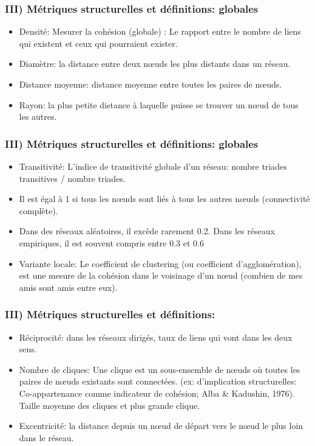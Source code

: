 \documentclass{beamer}
\begin{document}
\begin{frame}
    \frametitle{III) Métriques structurelles et définitions: globales}
    \begin{itemize}
        \item Densité: Mesurer la cohésion (globale) : Le rapport entre le nombre de liens qui existent et ceux qui pourraient exister.
        \item Diamètre: la distance entre deux nœuds les plus distants dans un réseau.
        \item Distance moyenne: distance moyenne entre toutes les paires de nœuds.
        \item Rayon:  la plus petite distance à laquelle puisse se trouver un nœud de tous les autres.
    \end{itemize}
\end{frame}

\begin{frame}
    \frametitle{III) Métriques structurelles et définitions: globales}
    \begin{itemize}
        \item Transitivité: L’indice de transitivité globale d’un réseau: nombre triades transitives / nombre triades.
        \item Il est égal à 1 si tous les nœuds sont liés à tous les autres nœuds (connectivité complète).
        \item Dans des réseaux aléatoires, il excède rarement 0.2. Dans les réseaux empiriques, il est souvent compris entre 0.3 et 0.6
        \item Variante locale: Le coefficient de clustering (ou coefficient d’agglomération), est une mesure de la cohésion dans le voisinage d’un nœud (combien de mes amis sont amis entre eux).
    \end{itemize}
\end{frame}

\begin{frame}
    \frametitle{III) Métriques structurelles et définitions:}
    \begin{itemize}
        \item Réciprocité: dans les réseaux dirigés, taux de liens qui vont dans les deux sens.
        \item Nombre de cliques: Une clique est un sous-ensemble de nœuds où toutes les paires de nœuds existants sont connectées. (ex: d'implication structurelles:  Co-appartenance comme indicateur de cohésion; Alba \& Kadushin, 1976). Taille moyenne des cliques et plus grande clique.
        \item Excentricité: la distance depuis un nœud de départ vers le nœud le plus loin dans le réseau.
    \end{itemize}
\end{frame}
\end{document}
